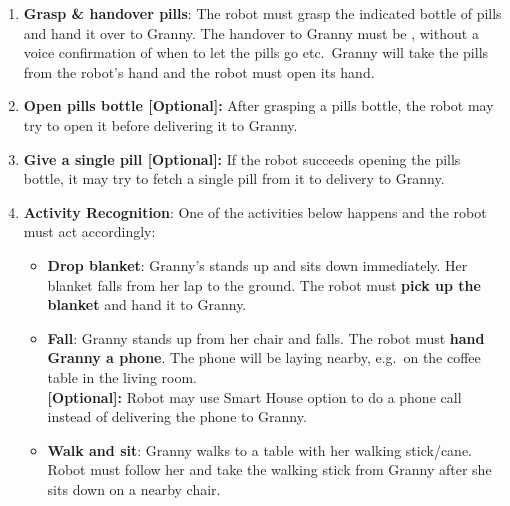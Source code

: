 \begin{enumerate}
 	\item \textbf{Grasp \& handover pills}: The robot must grasp the indicated bottle of pills and hand it over to Granny. The handover to Granny must be , without a voice confirmation of when to let the pills go etc.~Granny will take the pills from the robot's hand and the robot must open its hand.

 	\item \textbf{Open pills bottle [Optional]:} After grasping a pills bottle, the robot may try to open it before delivering it to Granny.

 	\item \textbf{Give a single pill [Optional]:} If the robot succeeds opening the pills bottle, it may try to fetch a single pill from it to delivery to Granny.

 	\item \textbf{Activity Recognition}: One of the activities below happens and the robot must act accordingly:
 	\begin{itemize}
 		\item \textbf{Drop blanket}: Granny's stands up and sits down immediately. Her blanket falls from her lap to the ground. The robot must \textbf{pick up the blanket} and hand it to Granny.

 		\item \textbf{Fall}: Granny stands up from her chair and falls. The robot must \textbf{hand Granny a phone}. The phone will be laying nearby, e.g.~on the coffee table in the living room. \\
		\textbf{[Optional]:} Robot may use Smart House option to do a phone call instead of delivering the phone to Granny.

 		\item \textbf{Walk and sit}: Granny walks to a table with her walking stick/cane. Robot must follow her and take the walking stick from Granny after she sits down on a nearby chair.
 	\end{itemize}
\end{enumerate}


